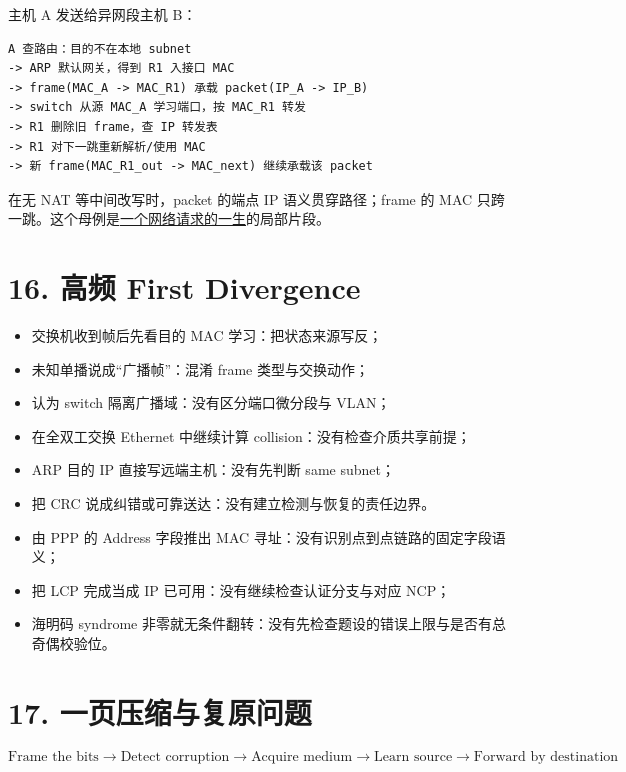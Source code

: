 \documentclass[UTF8,fontset=none,11pt,a4paper]{ctexart}
\providecommand{\tightlist}{\setlength{\itemsep}{0pt}\setlength{\parskip}{0pt}}
\begin{document}
主机 A 发送给异网段主机 B：

\begin{lstlisting}
A 查路由：目的不在本地 subnet
-> ARP 默认网关，得到 R1 入接口 MAC
-> frame(MAC_A -> MAC_R1) 承载 packet(IP_A -> IP_B)
-> switch 从源 MAC_A 学习端口，按 MAC_R1 转发
-> R1 删除旧 frame，查 IP 转发表
-> R1 对下一跳重新解析/使用 MAC
-> 新 frame(MAC_R1_out -> MAC_next) 继续承载该 packet
\end{lstlisting}

在无 NAT 等中间改写时，packet 的端点 IP 语义贯穿路径；frame 的 MAC
只跨一跳。这个母例是\href{../60_综合专题/README.md}{一个网络请求的一生}的局部片段。

\section{16. 高频 First
Divergence}\label{13-ux9ad8ux9891-first-divergence}

\begin{itemize}
\tightlist
\item
  交换机收到帧后先看目的 MAC 学习：把状态来源写反；
\item
  未知单播说成``广播帧''：混淆 frame 类型与交换动作；
\item
  认为 switch 隔离广播域：没有区分端口微分段与 VLAN；
\item
  在全双工交换 Ethernet 中继续计算 collision：没有检查介质共享前提；
\item
  ARP 目的 IP 直接写远端主机：没有先判断 same subnet；
\item
  把 CRC 说成纠错或可靠送达：没有建立检测与恢复的责任边界。
\item
  由 PPP 的 Address 字段推出 MAC 寻址：没有识别点到点链路的固定字段语义；
\item
  把 LCP 完成当成 IP 已可用：没有继续检查认证分支与对应 NCP；
\item
  海明码 syndrome 非零就无条件翻转：没有先检查题设的错误上限与是否有总奇偶校验位。
\end{itemize}

\section{17.
一页压缩与复原问题}\label{14-ux4e00ux9875ux538bux7f29ux4e0eux590dux539fux95eeux9898}

\[
\boxed{
\text{Frame the bits}
\to \text{Detect corruption}
\to \text{Acquire medium}
\to \text{Learn source}
\to \text{Forward by destination}
}
\]
\end{document}
